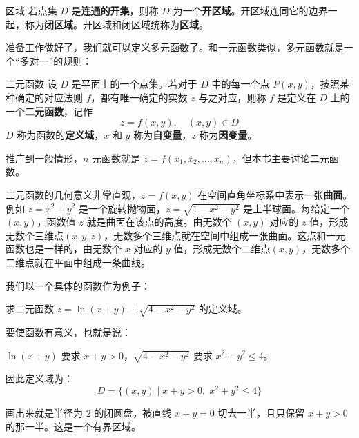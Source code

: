 \begin{definition}{区域}{}
若点集 $D$ 是\textbf{连通的开集}，则称 $D$ 为一个\textbf{开区域}。开区域连同它的边界一起，称为\textbf{闭区域}。开区域和闭区域统称为\textbf{区域}。
\end{definition}

准备工作做好了，我们就可以定义多元函数了。和一元函数类似，多元函数就是一个“多对一”的规则：

\begin{definition}{二元函数}{}
设 $D$ 是平面上的一个点集。若对于 $D$ 中的每一个点 $P(x,y)$，按照某种确定的对应法则 $f$，都有唯一确定的实数 $z$ 与之对应，则称 $f$ 是定义在 $D$ 上的一个\textbf{二元函数}，记作
\[
z = f(x, y), \quad (x,y) \in D
\]
$D$ 称为函数的\textbf{定义域}，$x$ 和 $y$ 称为\textbf{自变量}，$z$ 称为\textbf{因变量}。
\end{definition}

推广到一般情形，$n$ 元函数就是 $z = f(x_1, x_2, \dots, x_n)$，但本书主要讨论二元函数。

二元函数的几何意义非常直观，$z = f(x,y)$ 在空间直角坐标系中表示一张\textbf{曲面}。例如 $z = x^2 + y^2$ 是一个旋转抛物面，$z = \sqrt{1-x^2-y^2}$ 是上半球面。每给定一个 $(x,y)$，函数值 $z$ 就是曲面在该点的高度。由无数个 $(x,y)$ 对应的 $z$ 值，形成无数个三维点$(x,y,z)$，无数多个三维点就在空间中组成一张曲面。这点和一元函数也是一样的，由无数个 $x$ 对应的 $y$ 值，形成无数个二维点$(x,y)$，无数多个二维点就在平面中组成一条曲线。

我们以一个具体的函数作为例子：
\begin{myexample}
  求二元函数 $z = \ln(x+y) + \sqrt{4-x^2-y^2}$ 的定义域。

  要使函数有意义，也就是说：

  $\ln(x+y)$ 要求 $x + y > 0$，$\sqrt{4-x^2-y^2}$ 要求 $x^2 + y^2 \leq 4$。

  因此定义域为：
  \[
  D = \{ (x,y) \mid x + y > 0,\; x^2 + y^2 \leq 4 \}
  \]
\end{myexample}
  
  画出来就是半径为 $2$ 的闭圆盘，被直线 $x+y=0$ 切去一半，且只保留 $x+y>0$ 的那一半。这是一个有界区域。


